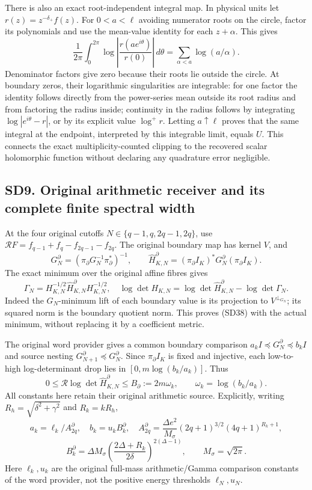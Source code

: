 \documentclass[11pt]{article}
\begin{document}
There is also an exact root-independent integral map. In physical units let \(r(z)=z^{-\delta_+}f(z)\). For \(0<a<\ell\) avoiding numerator roots on the circle, factor its polynomials and use the mean-value identity for each \(z+\alpha\). This gives \[
\frac1{2\pi}\int_0^{2\pi}
\log\left|\frac{r(ae^{i\theta})}{r(0)}\right|\,d\theta
=\sum_{\alpha<a}\log(a/\alpha).
\tag{SD37}
\] Denominator factors give zero because their roots lie outside the circle. At boundary zeros, their logarithmic singularities are integrable: for one factor the identity follows directly from the power-series mean outside its root radius and from factoring the radius inside; continuity in the radius follows by integrating \(\log|e^{i\theta}-r|\), or by its explicit value \(\log^+r\). Letting \(a\uparrow\ell\) proves that the same integral at the endpoint, interpreted by this integrable limit, equals \(U\). This connects the exact multiplicity-counted clipping to the recovered scalar holomorphic function without declaring any quadrature error negligible.

\subsection{SD9. Original arithmetic receiver and its complete finite spectral width}\label{sd9.-original-arithmetic-receiver-and-its-complete-finite-spectral-width}

At the four original cutoffs \(N\in\{q-1,q,2q-1,2q\}\), use \(\mathcal RF=f_{q-1}+f_q-f_{2q-1}-f_{2q}\). The original boundary map has kernel \(V\), and \[
G_N^\partial=(\pi_\partial G_N^{-1}\pi_\partial^*)^{-1},\qquad
\widehat H_{K,N}^\partial=(\pi_\partial I_K)^*G_N^\partial(\pi_\partial I_K).
\] The exact minimum over the original affine fibres gives \[
\Gamma_N=H_{K,N}^{-1/2}\widehat H_{K,N}^\partial H_{K,N}^{-1/2},
\quad
\log\det H_{K,N}=\log\det\widehat H_{K,N}^\partial-\log\det\Gamma_N.
\tag{SD38}
\] Indeed the \(G_N\)-minimum lift of each boundary value is its projection to \(V^{\perp_{G_N}}\); its squared norm is the boundary quotient norm. This proves (SD38) with the actual minimum, without replacing it by a coefficient metric.

The original word provider gives a common boundary comparison \(a_kI\preceq G_N^\partial\preceq b_kI\) and source nesting \(G_{N+1}^\partial\preceq G_N^\partial\). Since \(\pi_\partial I_K\) is fixed and injective, each low-to-high log-determinant drop lies in \([0,m\log(b_k/a_k)]\). Thus \[
0\le\mathcal R\log\det\widehat H_{K,N}^\partial
\le B_\partial:=2m\omega_k,\qquad\omega_k=\log(b_k/a_k).
\tag{SD39}
\] All constants here retain their original arithmetic source. Explicitly, writing \(R_h=\sqrt{\delta^2+\gamma^2}\) and \(R_k=kR_h\), \[
a_k=\ell_k/A_{2q}^\partial,\quad b_k=u_kB_k^\partial,\quad
A_{2q}^\partial=\frac{\Delta e^2}{M_\sigma}(2q+1)^{3/2}(4q+1)^{R_k+1},
\] \[
B_k^\partial=\Delta M_\sigma
\left(\frac{2\Delta+R_k}{2\delta}\right)^{2(\Delta-1)},\qquad M_\sigma=\sqrt{2\pi}.
\] Here \(\ell_k,u_k\) are the original full-mass arithmetic/Gamma comparison constants of the word provider, not the positive energy thresholds \(\ell_N,u_N\).
\end{document}
